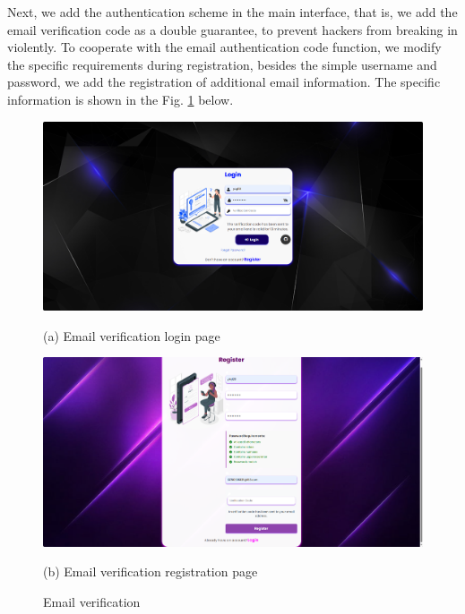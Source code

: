 \documentclass{article}
\begin{document}
Next, we add the authentication scheme in the main interface, that is, we add the email verification code as a double guarantee, to prevent hackers from breaking in violently. 
To cooperate with the email authentication code function, we modify the specific requirements during registration, besides the simple username and password, we add the registration of additional email information. 
The specific information is shown in the Fig. \ref{fig:email_verification} below.
\begin{figure}[htb]
    \begin{minipage}{0.5\textwidth}
        \centering
        \includegraphics[width=\textwidth]{images/email_authentication_login_screen.png}
        \caption*{(a) Email verification login page}
    \end{minipage}
    \hfill
    \begin{minipage}{0.5\textwidth}
        \centering
        \includegraphics[width=\textwidth]{images/email_authentication_register_screen.png}
        \caption*{(b) Email verification registration page}
    \end{minipage}
    \caption{Email verification}
    \label{fig:email_verification}
\end{figure}
\end{document}
